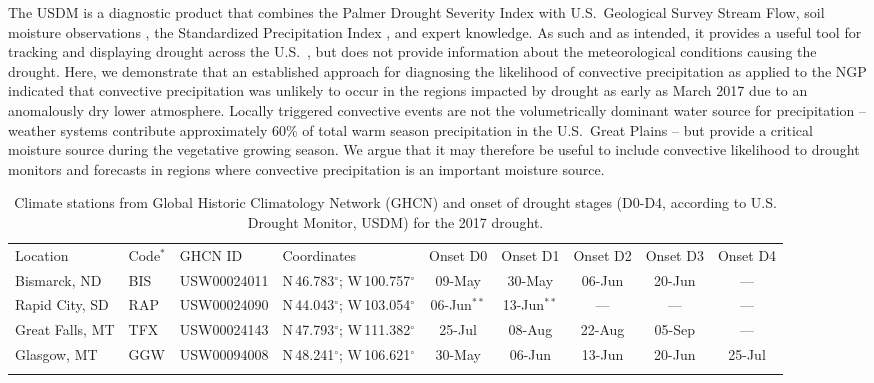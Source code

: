 \documentclass[hess, manuscript]{copernicus}
\begin{document}
The USDM is a diagnostic product that combines the Palmer Drought Severity Index \citep[PDSI,][]{Palmer_1965, Alley_1984} with U.S.~Geological Survey Stream Flow, soil moisture observations \citep{Fan_2004}, the Standardized Precipitation Index \citep{Guttman_1998, Guttman_1999}, and expert knowledge. As such and as intended, it provides a useful tool for tracking and displaying drought across the U.S.~\citep{Svoboda_2002}, but does not provide information about the meteorological conditions causing the drought. Here, we demonstrate that an established approach for diagnosing the likelihood of convective precipitation \citep{Findell_2003a, Findell_2003b} as applied to the NGP \citep{Gerken_2018} indicated that convective precipitation was unlikely to occur in the regions impacted by drought as early as March 2017 due to an anomalously dry lower atmosphere. Locally triggered convective events are not the volumetrically dominant water source for precipitation -- weather systems contribute approximately 60\% of total warm season precipitation in the U.S.~Great Plains \citep{Carbone_2008} -- but provide a critical moisture source during the vegetative growing season. We argue that it may therefore be useful to include convective likelihood to drought monitors and forecasts in regions where convective precipitation is an important moisture source.
\begin{table}[t]
\caption{Climate stations from Global Historic Climatology Network (GHCN) and onset of drought stages (D0-D4, according to U.S. Drought Monitor, USDM) for the 2017 drought.}
\begin{tabular}{llllccccc}
\tophline
Location & Code$^*$ & GHCN ID & Coordinates & Onset D0& Onset D1& Onset D2& Onset D3& Onset D4\\
\middlehline
Bismarck, ND& 	BIS& 	USW00024011 &	N\,46.783$\mathrm{^\circ}$; W\,100.757$\mathrm{^\circ}$ &	09-May&	30-May	& 06-Jun&	20-Jun	&--- \\
Rapid City, SD&	RAP&	USW00024090 &	N\,44.043$\mathrm{^\circ}$; W\,103.054$\mathrm{^\circ}$&	06-Jun$^{**}$ &	13-Jun$^{**}$ &	---	&---	& --- \\
Great Falls, MT&	TFX&	USW00024143 &	N\,47.793$\mathrm{^\circ}$; W\,111.382$\mathrm{^\circ}$&	25-Jul &	08-Aug &	22-Aug	& 05-Sep	& --- \\
Glasgow, MT &	GGW&	USW00094008 &	N\,48.241$\mathrm{^\circ}$; W\,106.621$\mathrm{^\circ}$&	30-May &	06-Jun &	13-Jun	&20-Jun	& 25-Jul \\
\bottomhline
\end{tabular}
\end{table}\label{Tab:1}
\end{document}
